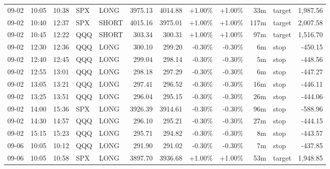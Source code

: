 \documentclass[11pt,a4paper,twoside]{article}
\begin{document}
\begin{center}
\begin{longtable}{>{\color{txtmain}}l l l l l r r r r r >{\color{txtmain}}l r}
09-02 & 10:05 & 10:38 & SPX & LONG & 3975.13 & 4014.88 & \textcolor{wingreen}{+1.00\%} & \textcolor{wingreen}{+1.00\%} & 33m & target & \textcolor{wingreen}{1,987.56} \\
09-02 & 10:40 & 12:37 & SPX & SHORT & 4015.16 & 3975.01 & \textcolor{wingreen}{+1.00\%} & \textcolor{wingreen}{+1.00\%} & 117m & target & \textcolor{wingreen}{2,007.58} \\
09-02 & 10:45 & 12:22 & QQQ & SHORT & 303.34 & 300.31 & \textcolor{wingreen}{+1.00\%} & \textcolor{wingreen}{+1.00\%} & 97m & target & \textcolor{wingreen}{1,516.70} \\
09-02 & 12:30 & 12:36 & QQQ & LONG & 300.10 & 299.20 & \textcolor{lossred}{-0.30\%} & \textcolor{lossred}{-0.30\%} & 6m & stop & \textcolor{lossred}{-450.15} \\
09-02 & 12:40 & 12:45 & QQQ & LONG & 299.04 & 298.14 & \textcolor{lossred}{-0.30\%} & \textcolor{lossred}{-0.30\%} & 5m & stop & \textcolor{lossred}{-448.56} \\
09-02 & 12:55 & 13:01 & QQQ & LONG & 298.18 & 297.29 & \textcolor{lossred}{-0.30\%} & \textcolor{lossred}{-0.30\%} & 6m & stop & \textcolor{lossred}{-447.27} \\
09-02 & 13:05 & 13:21 & QQQ & LONG & 297.41 & 296.52 & \textcolor{lossred}{-0.30\%} & \textcolor{lossred}{-0.30\%} & 16m & stop & \textcolor{lossred}{-446.11} \\
09-02 & 13:25 & 13:51 & QQQ & LONG & 296.04 & 295.15 & \textcolor{lossred}{-0.30\%} & \textcolor{lossred}{-0.30\%} & 26m & stop & \textcolor{lossred}{-444.06} \\
09-02 & 14:00 & 15:36 & SPX & LONG & 3926.39 & 3914.61 & \textcolor{lossred}{-0.30\%} & \textcolor{lossred}{-0.30\%} & 96m & stop & \textcolor{lossred}{-588.96} \\
09-02 & 14:30 & 14:57 & QQQ & LONG & 296.10 & 295.21 & \textcolor{lossred}{-0.30\%} & \textcolor{lossred}{-0.30\%} & 27m & stop & \textcolor{lossred}{-444.15} \\
09-02 & 15:15 & 15:23 & QQQ & LONG & 295.71 & 294.82 & \textcolor{lossred}{-0.30\%} & \textcolor{lossred}{-0.30\%} & 8m & stop & \textcolor{lossred}{-443.57} \\
09-06 & 10:05 & 10:12 & QQQ & LONG & 291.90 & 291.02 & \textcolor{lossred}{-0.30\%} & \textcolor{lossred}{-0.30\%} & 7m & stop & \textcolor{lossred}{-437.85} \\
09-06 & 10:05 & 10:58 & SPX & LONG & 3897.70 & 3936.68 & \textcolor{wingreen}{+1.00\%} & \textcolor{wingreen}{+1.00\%} & 53m & target & \textcolor{wingreen}{1,948.85} \\

\end{longtable}
\end{center}
\end{document}
